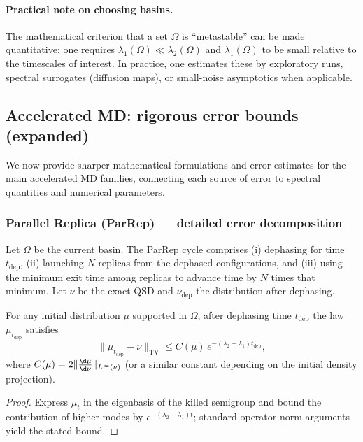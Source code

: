 \paragraph{Practical note on choosing basins.}
The mathematical criterion that a set $\Omega$ is ``metastable'' can be made quantitative: one requires $\lambda_1(\Omega)\ll\lambda_2(\Omega)$ and $\lambda_1(\Omega)$ to be small relative to the timescales of interest. In practice, one estimates these by exploratory runs, spectral surrogates (diffusion maps), or small-noise asymptotics when applicable.

\subsection{Accelerated MD: rigorous error bounds (expanded)}

We now provide sharper mathematical formulations and error estimates for the main accelerated MD families, connecting each source of error to spectral quantities and numerical parameters.

\subsubsection*{Parallel Replica (ParRep) — detailed error decomposition}

Let $\Omega$ be the current basin. The ParRep cycle comprises (i) dephasing for time $t_{\mathrm{dep}}$, (ii) launching $N$ replicas from the dephased configurations, and (iii) using the minimum exit time among replicas to advance time by $N$ times that minimum. Let $\nu$ be the exact QSD and $\nu_{\mathrm{dep}}$ the distribution after dephasing.

\begin{proposition}\label{prop:dephasing}
For any initial distribution $\mu$ supported in $\Omega$, after dephasing time $t_{\mathrm{dep}}$ the law $\mu_{t_{\mathrm{dep}}}$ satisfies
\[
\|\mu_{t_{\mathrm{dep}}}-\nu\|_{\mathrm{TV}} \le C(\mu)\,e^{-(\lambda_2-\lambda_1)t_{\mathrm{dep}}},
\]
where $C(\mu)=2\|\frac{\d\mu}{\d\nu}\|_{L^\infty(\nu)}$ (or a similar constant depending on the initial density projection).
\end{proposition}

\begin{proof}
Express $\mu_{t}$ in the eigenbasis of the killed semigroup and bound the contribution of higher modes by $e^{-(\lambda_2-\lambda_1)t}$; standard operator-norm arguments yield the stated bound.
\end{proof}

